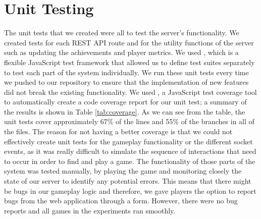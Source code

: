 \documentclass{l4proj}
\begin{document}
\section{Unit Testing} 
The unit tests that we created were all to test the server's functionality. We created tests for each REST API route and for the utility functions of the server such as updating the achievements and player metrics. We used \cite{mocha}, which is a flexible JavaScript test framework that allowed us to define test suites separately to test each part of the system individually. We run these unit tests every time we pushed to our repository to ensure that the implementation of new features did not break the existing functionality. 
We used \cite{insta}, a JavaScript test coverage tool to automatically create a code coverage report for our unit test; a summary of the results is shown in Table \ref{tab:coverage}. As we can see from the table, the unit tests cover approximately 67\% of the lines and 55\% of the branches in all of the files. The reason for not having a better coverage is that we could not effectively create unit tests for the gameplay functionality or the different socket events, as it was really difficult to simulate the sequence of interactions that need to occur in order to find and play a game. The functionality of those parts of the system was tested manually, by playing the game and monitoring closely the state of our server to identify any potential errors. This means that there might be bugs in our gameplay logic and therefore, we gave players the option to report bugs from the web application through a form. However, there were no bug reports and all games in the experiments ran smoothly. 

\begin{table}
\centering
{}
\caption{A table showing the code coverage for the server's high level directories produced by Instanbul.}
\label{tab:coverage}
\end{table}
\end{document}
